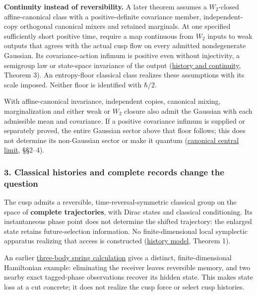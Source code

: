 \documentclass[11pt,a4paper]{article}
\begin{document}
\textbf{Continuity instead of reversibility.} A later theorem assumes a
\(W_2\)-closed affine-canonical class with a positive-definite
covariance member, independent-copy orthogonal canonical mixers and
retained marginals. At one specified sufficiently short positive time,
require a map continuous from \(W_2\) inputs to weak outputs that agrees
with the actual cusp flow on every admitted nondegenerate Gaussian. Its
covariance-action infimum is positive even without injectivity, a
semigroup law or state-space invariance of the output
(\href{cusp-history-records-continuity.md}{history and continuity},
Theorem 3). An entropy-floor classical class realizes these assumptions
with its scale imposed. Neither floor is identified with \(\hbar/2\).

With affine-canonical invariance, independent copies, canonical mixing,
marginalization and either weak or \(W_2\) closure also admit the
Gaussian with each admissible mean and covariance. If a positive
covariance infimum is supplied or separately proved, the entire Gaussian
sector above that floor follows; this does not determine its
non-Gaussian sector or make it quantum
(\href{central-limit-canonical-gaussian-sector.md}{canonical central
limit}, §§2--4).

\hypertarget{classical-histories-and-complete-records-change-the-question}{%
\subsubsection{3. Classical histories and complete records change the
question}\label{classical-histories-and-complete-records-change-the-question}}

The cusp admits a reversible, time-reversal-symmetric classical group on
the space of \textbf{complete trajectories}, with Dirac states and
classical conditioning. Its instantaneous phase point does not determine
the shifted trajectory: the enlarged state retains future-selection
information. No finite-dimensional local symplectic apparatus realizing
that access is constructed
(\href{cusp-history-records-continuity.md}{history model}, Theorem 1).

An earlier \href{conservative-harmonic-receiver.md}{three-body spring
calculation} gives a distinct, finite-dimensional Hamiltonian example:
eliminating the receiver leaves reversible memory, and two nearby exact
tagged-phase observations recover its hidden state. This makes state
loss at a cut concrete; it does not realize the cusp force or select
cusp histories.
\end{document}
